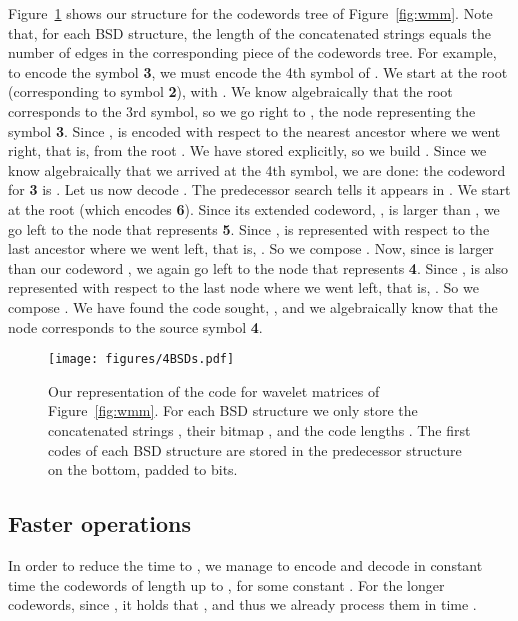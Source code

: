 \documentclass[preprint,12pt]{elsarticle}
\begin{document}
Figure~\ref{fig:bsd} shows our structure for the codewords tree of
Figure~\ref{fig:wmm}. Note that, for each BSD structure, the length of the
concatenated strings  equals the number of edges in the corresponding
piece of the codewords tree. For example, to encode the symbol {\bf 3}, we
must encode the 4th symbol of . We start at the root  (corresponding
to symbol {\bf 2}), with . We know algebraically that the root
corresponds to the 3rd symbol, so we go right to , the node representing
the symbol {\bf 3}. Since ,  is encoded with respect to the
nearest ancestor where we went right, that is, from the root . We have
 stored explicitly, so we build . Since we know algebraically that we arrived at the 4th symbol, 
we are done: the codeword for {\bf 3} is . Let us now decode .
The predecessor search tells it appears in . We start at the root 
(which encodes {\bf 6}). Since its extended codeword, , is
larger than , we go left to the node  that represents {\bf 5}. Since
,  is represented with respect to the last ancestor where we
went left, that is, . So we compose . Now, since  is larger than our codeword , we 
again
go left to the node  that represents {\bf 4}. Since , 
is also represented with respect to the last node where we went left, that is,
. So we compose .
We have found the code sought, , and we algebraically know that the node
corresponds to the source symbol {\bf 4}.

\begin{figure}[t]
\begin{center}
\texttt{[image: figures/4BSDs.pdf]}
\end{center}
\vspace*{-5mm}
\caption{Our representation of the code for wavelet matrices of 
Figure~\ref{fig:wmm}. For each BSD structure we only store the
concatenated strings , their bitmap , and the code lengths .
The first codes of each BSD structure are stored in the predecessor structure
on the bottom, padded to  bits.}
\label{fig:bsd}
\end{figure}

\subsection{Faster operations}

In order to reduce the time  to , we 
manage to encode and decode in constant time the codewords of length up to
, for some constant . For the longer codewords,
since , it holds that , and thus
we already process them in time .
\end{document}
